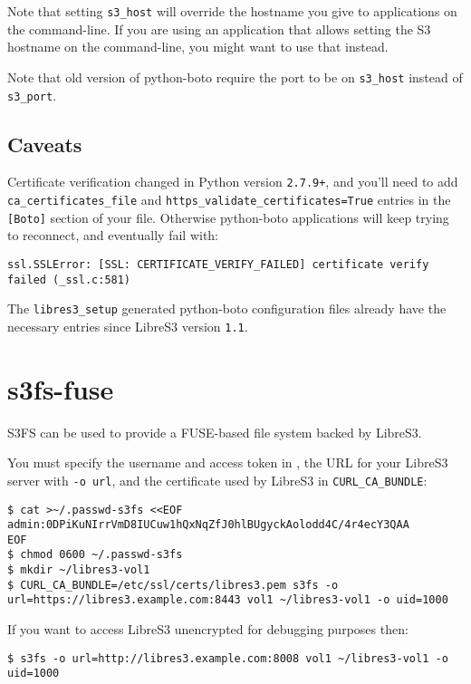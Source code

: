 Note that setting \verb|s3_host| will override the hostname you give to
applications on the command-line. If you are using an application that allows
setting the S3 hostname on the command-line, you might want to use that instead.

Note that old version of python-boto require the port to be on \verb|s3_host|
instead of \verb|s3_port|.

\subsection{Caveats}

Certificate verification changed in Python version \verb|2.7.9+|, and you'll need
to add \verb|ca_certificates_file| and \verb|https_validate_certificates=True| entries in the \verb|[Boto]| section of
your  file.
Otherwise python-boto applications will keep trying to reconnect, and eventually
fail with:
\begin{lstlisting}
ssl.SSLError: [SSL: CERTIFICATE_VERIFY_FAILED] certificate verify failed (_ssl.c:581)
\end{lstlisting}

The \verb|libres3_setup| generated python-boto configuration files already have
the necessary entries since LibreS3 version \verb|1.1|.

\section{s3fs-fuse}

S3FS can be used to provide a FUSE-based file system backed by LibreS3.

You must specify the \SX username and access token in ,
the URL for your LibreS3 server with \verb|-o url|, and the certificate
used by LibreS3 in \verb|CURL_CA_BUNDLE|:
\begin{lstlisting}
$ cat >~/.passwd-s3fs <<EOF
admin:0DPiKuNIrrVmD8IUCuw1hQxNqZfJ0hlBUgyckAolodd4C/4r4ecY3QAA
EOF
$ chmod 0600 ~/.passwd-s3fs
$ mkdir ~/libres3-vol1
$ CURL_CA_BUNDLE=/etc/ssl/certs/libres3.pem s3fs -o url=https://libres3.example.com:8443 vol1 ~/libres3-vol1 -o uid=1000
\end{lstlisting}

If you want to access LibreS3 unencrypted for debugging purposes then:
\begin{lstlisting}
$ s3fs -o url=http://libres3.example.com:8008 vol1 ~/libres3-vol1 -o uid=1000
\end{lstlisting}

